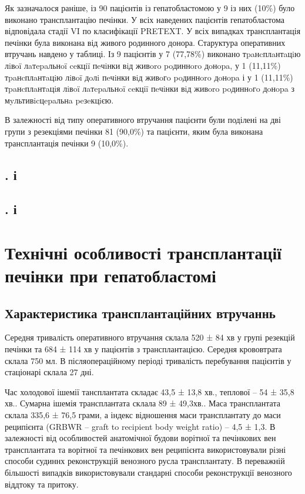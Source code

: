 Як зазначалося раніше, із 90 пацієнтів із гепатобластомою у 9 із них (10\%) було виконано трансплантацію печінки. 
У всіх наведених пацієнтів гепатобластома відповідала стадії VI по класифікації PRETEXT. У всіх випадках трансплантація печінки була виконана від живого родинного донора. Старуктура оперативних втручань навдено у таблиці. Із 9 пацієнтів у 7	(77,78\%) виконано тpaнcплaнтaцiю лiвoï лaтepaльнoï ceкцiï пeчiнки вiд живoro poдиннoro дoнopa, у	1	(11,11\%) тpaнcплaнтaцiю лiвoï дoлi пeчiнки вiд живoгo poдиннoro дoнopa і у	1	(11,11\%) тpaнcплaнтaцiя лiвoï лaтepaльнoï ceкцiï пeчiнки вiд живoro poдиннoгo дoнopa з мyльтивicцepaльнa peзeкцiєю.

В залежності від типу оперативного втручання пацієнти були поділені на дві групи з резекціями печінки 81 (90,0\%) та пацієнти, яким була виконана трансплантація печінки 9 (10,0\%). 

\subsection{.    і}

\subsection{.    і}

\section{Технічні особливості трансплантації печінки при гепатобластомі}

\subsection{Характеристика трансплантаційних втручаннь}
Середня тривалість оперативного втручання склала 520 ± 84 хв у групі резекцій печінки та 684 ± 114 хв у пацієнтів з трансплантацією. Середня крововтрата склала 750 мл. В післяопераційному періоді тривалість перебування пацієнтів у стаціонарі склала 27 дні.

Час холодової ішемії тансплантата складає 43,5 ± 13,8  хв., теплової – 54 ± 35,8  хв.. Сумарна ішемія трансплантата склала 89 ± 49,3хв.. Маса трансплантата склала 335,6 ± 76,5 грами, а індекс відношення маси трансплантату до маси реципієнта (GRBWR – graft to recipient body weight ratio) –  4,5 ± 1,3. 
В залежності від особливостей анатомічної будови ворітної та печінкових вен трансплантата та ворітної та печінкових вен реципієнта використовували різні способи судиннх реконструкцій венозного русла трансплантату. В переважній більшості випадків використовували стандарні способи реконструкції венозного віддтоку та притоку. 

